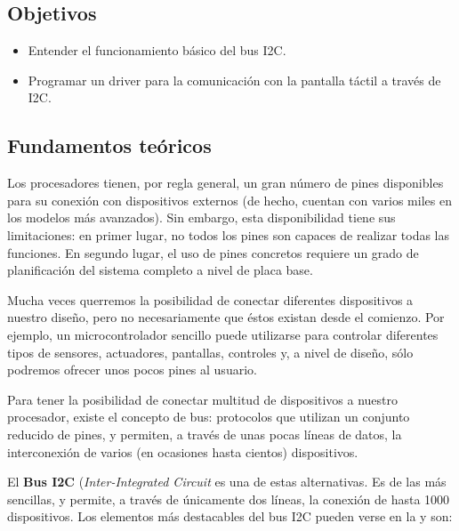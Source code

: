 \documentclass[../main.tex]{subfiles}
\begin{document}

    \subsection{Objetivos}
        \begin{itemize}
            \item Entender el funcionamiento básico del bus I2C.
            \item Programar un driver para la comunicación con la pantalla táctil a través de I2C.
        \end{itemize}

    \subsection{Fundamentos teóricos}
        
        Los procesadores tienen, por regla general, un gran número de pines disponibles para su conexión con dispositivos externos (de hecho, cuentan con varios miles en los modelos más avanzados). Sin embargo, esta disponibilidad tiene sus limitaciones: en primer lugar, no todos los pines son capaces de realizar todas las funciones. En segundo lugar, el uso de pines concretos requiere un grado de planificación del sistema completo a nivel de placa base. 
        
        Mucha veces querremos la posibilidad de conectar diferentes dispositivos a nuestro diseño, pero no necesariamente que éstos existan desde el comienzo. Por ejemplo, un microcontrolador sencillo puede utilizarse para controlar diferentes tipos de sensores, actuadores, pantallas, controles y, a nivel de diseño, sólo podremos ofrecer unos pocos pines al usuario.

        Para tener la posibilidad de conectar multitud de dispositivos a nuestro procesador, existe el concepto de bus: protocolos que utilizan un conjunto reducido de pines, y permiten, a través de unas pocas líneas de datos, la interconexión de varios (en ocasiones hasta cientos) dispositivos.

        El \textbf{Bus I2C} (\emph{Inter-Integrated Circuit} es una de estas alternativas. Es de las más sencillas, y permite, a través de únicamente dos líneas, la conexión de hasta 1000 dispositivos. Los elementos más destacables del bus I2C pueden verse en la  y son:
\end{document}
